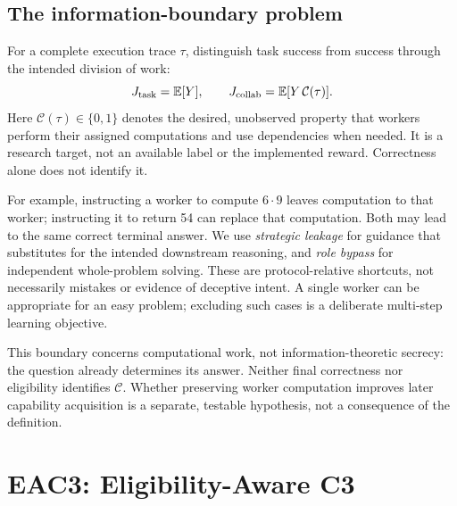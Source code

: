 \documentclass[11pt]{article}
\begin{document}
\subsection{The information-boundary problem}
For a complete execution trace $\tau$, distinguish task success from success through the intended division of work:
\begin{equation}
J_{\rm task}=\mathbb E[Y],\qquad
J_{\rm collab}=\mathbb E[Y\,\mathcal C(\tau)].
\end{equation}
Here $\mathcal C(\tau)\in\{0,1\}$ denotes the desired, unobserved property that workers perform their assigned computations and use dependencies when needed. It is a research target, not an available label or the implemented reward. Correctness alone does not identify it.

For example, instructing a worker to compute $6\cdot9$ leaves computation to that worker; instructing it to return 54 can replace that computation. Both may lead to the same correct terminal answer. We use \emph{strategic leakage} for guidance that substitutes for the intended downstream reasoning, and \emph{role bypass} for independent whole-problem solving. These are protocol-relative shortcuts, not necessarily mistakes or evidence of deceptive intent. A single worker can be appropriate for an easy problem; excluding such cases is a deliberate multi-step learning objective.

This boundary concerns computational work, not information-theoretic secrecy: the question already determines its answer. Neither final correctness nor eligibility identifies $\mathcal C$. Whether preserving worker computation improves later capability acquisition is a separate, testable hypothesis, not a consequence of the definition.

\section{EAC3: Eligibility-Aware C3}
\end{document}
